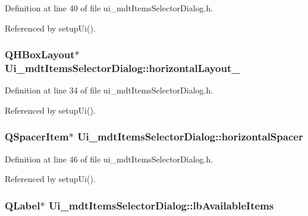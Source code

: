 Definition at line 40 of file ui\-\_\-mdt\-Items\-Selector\-Dialog.\-h.



Referenced by setup\-Ui().

\hypertarget{class_ui__mdt_items_selector_dialog_a0337a8fd075328bbee2ce55fffd4f5b9}{
\subsubsection[{horizontal\-Layout\-\_\-4}]{\setlength{\rightskip}{0pt plus 5cm}Q\-H\-Box\-Layout$\ast$ Ui\-\_\-mdt\-Items\-Selector\-Dialog\-::horizontal\-Layout\-\_}}\label{class_ui__mdt_items_selector_dialog_a0337a8fd075328bbee2ce55fffd4f5b9}


Definition at line 34 of file ui\-\_\-mdt\-Items\-Selector\-Dialog.\-h.



Referenced by setup\-Ui().

\hypertarget{class_ui__mdt_items_selector_dialog_ab8b6cac087d50dc7afed7f1c8d367718}{
\subsubsection[{horizontal\-Spacer}]{\setlength{\rightskip}{0pt plus 5cm}Q\-Spacer\-Item$\ast$ Ui\-\_\-mdt\-Items\-Selector\-Dialog\-::horizontal\-Spacer}}\label{class_ui__mdt_items_selector_dialog_ab8b6cac087d50dc7afed7f1c8d367718}


Definition at line 46 of file ui\-\_\-mdt\-Items\-Selector\-Dialog.\-h.



Referenced by setup\-Ui().

\hypertarget{class_ui__mdt_items_selector_dialog_a96ab760c3a735e8fed9e95c2ef1e30d8}{
\subsubsection[{lb\-Available\-Items}]{\setlength{\rightskip}{0pt plus 5cm}Q\-Label$\ast$ Ui\-\_\-mdt\-Items\-Selector\-Dialog\-::lb\-Available\-Items}}\label{class_ui__mdt_items_selector_dialog_a96ab760c3a735e8fed9e95c2ef1e30d8}


